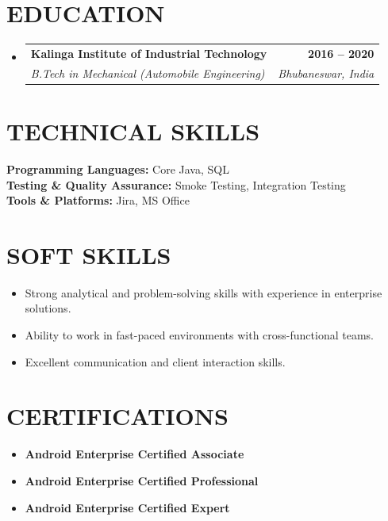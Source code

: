 \documentclass[letterpaper,11pt]{article}
\makeatletter
\newcommand{\resumeItem}[1]{
  \item\small{
    {#1 \vspace{-2pt}}
  }
}
\newcommand{\resumeSubheading}[4]{
  \vspace{-2pt}\item
    \begin{tabular*}{1.0\textwidth}[t]{l@{\extracolsep{\fill}}r}
      \textbf{\large#1} & \textbf{\small #2} \\
      \textit{\large#3} & \textit{\small #4} \\
      
    \end{tabular*}\vspace{-7pt}
}
\newcommand{\resumeSubHeadingListStart}{\begin{itemize}[leftmargin=0.0in, label={}]}
\newcommand{\resumeSubHeadingListEnd}{\end{itemize}}
\newcommand{\resumeItemListStart}{\begin{itemize}}
\newcommand{\resumeItemListEnd}{\end{itemize}\vspace{-5pt}}
\makeatother
\begin{document}
\section{EDUCATION}
  \resumeSubHeadingListStart
    \resumeSubheading
      {Kalinga Institute of Industrial Technology}{2016 -- 2020}
      {B.Tech in Mechanical (Automobile Engineering)}{Bhubaneswar, India}
  \resumeSubHeadingListEnd

\section{TECHNICAL SKILLS}
 \begin{itemize}[leftmargin=0.15in, label={}]
    \small{\item{
     \textbf{\normalsize{Programming Languages:}}{ 
     \normalsize{Core Java, SQL}} \\
     \textbf{\normalsize{Testing \& Quality Assurance:}}{ 
     \normalsize{Smoke Testing, Integration Testing}} \\
     \textbf{\normalsize{Tools \& Platforms:}}{ 
     \normalsize{Jira, MS Office}}
    }}
 \end{itemize}

\section{SOFT SKILLS}
    \vspace{0pt}
    \resumeItemListStart
        \resumeItem{\normalsize{Strong analytical and problem-solving skills with experience in enterprise solutions.}}
        \resumeItem{\normalsize{Ability to work in fast-paced environments with cross-functional teams.}}
        \resumeItem{\normalsize{Excellent communication and client interaction skills.}}
    \resumeItemListEnd

\section{CERTIFICATIONS}
    \vspace{0pt}
    \resumeItemListStart
        \resumeItem{\normalsize{\textbf{Android Enterprise Certified Associate}}}
        \resumeItem{\normalsize{\textbf{Android Enterprise Certified Professional}}}
        \resumeItem{\normalsize{\textbf{Android Enterprise Certified Expert}}}
    \resumeItemListEnd
\end{document}
